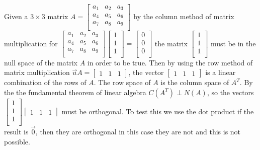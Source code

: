 				Given a $3\times3$ matrix 
				$A=\begin{bmatrix}
				    a_1 & a_2 & a_3 \\
				    a_4 & a_5 & a_6 \\
				    a_7 & a_8 & a_9 \\
				\end{bmatrix}$
				by the column method of matrix multiplication for $\begin{bmatrix}
				    a_1 & a_2 & a_3 \\
				    a_4 & a_5 & a_6 \\
				    a_7 & a_8 & a_9 \\
				\end{bmatrix}\begin{bmatrix}
				    1 \\
				    1 \\
				    1 \\
				\end{bmatrix}=
				\begin{bmatrix}
				    0 \\
				    0 \\
				    0 \\
				\end{bmatrix}$
			    the matrix $
			    \begin{bmatrix}
				    1 \\
				    1 \\
				    1 \\
				\end{bmatrix}$
				must be in the null space of the matrix $A$ in order to be true.  Then by using the row method of matrix multiplication $\vec{u}A=\begin{bmatrix}
				    1 & 1 & 1
				\end{bmatrix}$, the vector $\begin{bmatrix}
				    1 & 1 & 1
				\end{bmatrix}$ is a linear combination of the rows of $A$. The row space of $A$ is the column space of $A^T$. By the the fundamental theorem of linear algebra $C(A^T) \perp N(A)$, so the vectors $\begin{bmatrix}
				    1 \\
				    1 \\
				    1 \\
				\end{bmatrix} 
				\begin{bmatrix}
				    1 & 1 & 1
				\end{bmatrix}$ must be orthogonal. To test this we use the dot product if the result is $\vec{0}$, then they are orthogonal in this case they are not and this is not possible.
	